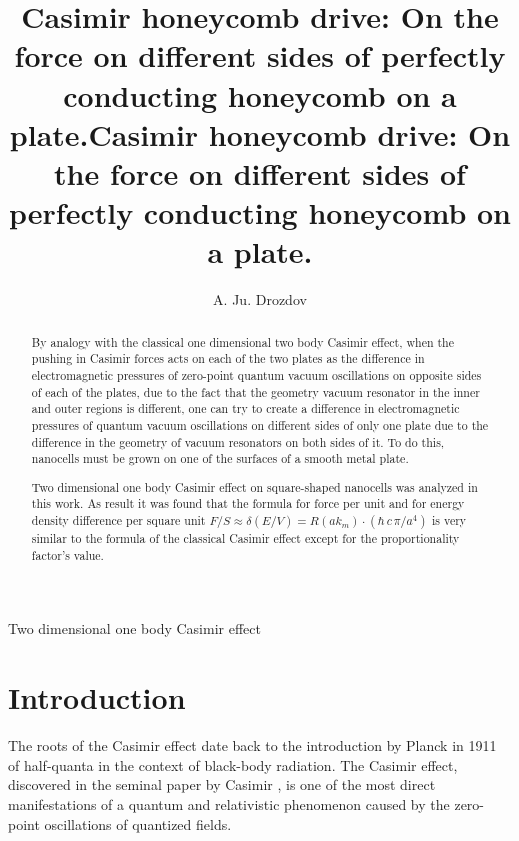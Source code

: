 \documentclass[11pt]{article}
\author{A. Ju. Drozdov}
\title{Casimir honeycomb drive: On the force on different sides of perfectly conducting honeycomb on a plate.}
\begin{document}
    
    \maketitle
    
    

    
    \title{Casimir honeycomb drive: On the force on different sides of perfectly conducting honeycomb on a plate.}

    \begin{abstract}

By analogy with the classical one dimensional two body Casimir effect, when the pushing in Casimir forces acts on each of the two plates as the difference in electromagnetic pressures of zero-point quantum vacuum oscillations on opposite sides of each of the plates, due to the fact that the geometry vacuum resonator in the inner and outer regions is different, one can try to create a difference in electromagnetic pressures of quantum vacuum oscillations on different sides of only one plate due to the difference in the geometry of vacuum resonators on both sides of it. To do this, nanocells must be grown on one of the surfaces of a smooth metal plate.

Two dimensional one body Casimir effect on square-shaped nanocells was analyzed in this work. As result it was found that the formula for force per unit and for energy density difference per square unit $F/S \approx \delta\left(E/V\right) = R\left(a k_m\right)\cdot\left(\hbar\,c\,\pi/{a^4}\right)$ is very similar to the formula of the classical Casimir effect except for the proportionality factor's value.

\end{abstract}

    \begin{keywords}
Two dimensional one body Casimir effect
\end{keywords}

    \section{Introduction}\label{introduction}

The roots of the Casimir effect date back to the introduction by Planck
in 1911 of half-quanta in the context of black-body radiation. The
Casimir effect, discovered in the seminal paper by Casimir
\cite{Casimir1948}, is one of the most direct manifestations of a
quantum and relativistic phenomenon caused by the zero-point
oscillations of quantized fields.
\end{document}
